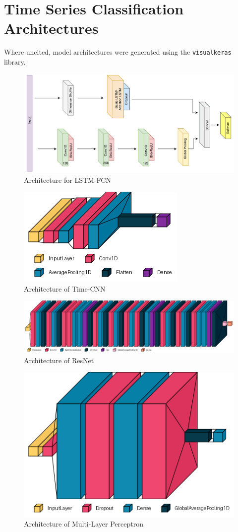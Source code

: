 \chapter{Time Series Classification Architectures}
\label{ch:series-architectures}

Where uncited, model architectures were generated using the \verb|visualkeras| library\cite{Gavrikov2020VisualKeras}.

\begin{figure}[h]
    \centering
    \includegraphics[width=0.75\linewidth]{dissertation//figures/lstm-fcn.png}
    \caption{Architecture for LSTM-FCN\cite{karim2017lstm}}
\end{figure}

\begin{figure}
    \centering
    \includegraphics[width=0.5\linewidth]{dissertation//figures/timecnn.png}
    \caption{Architecture of Time-CNN}
\end{figure}

\begin{figure}
    \centering
    \includegraphics[width=1\linewidth]{dissertation//figures/resnet.png}
    \caption{Architecture of ResNet}
\end{figure}

\begin{figure}
    \centering
    \includegraphics[width=0.5\linewidth]{mlp.png}
    \caption{Architecture of Multi-Layer Perceptron}
\end{figure}

